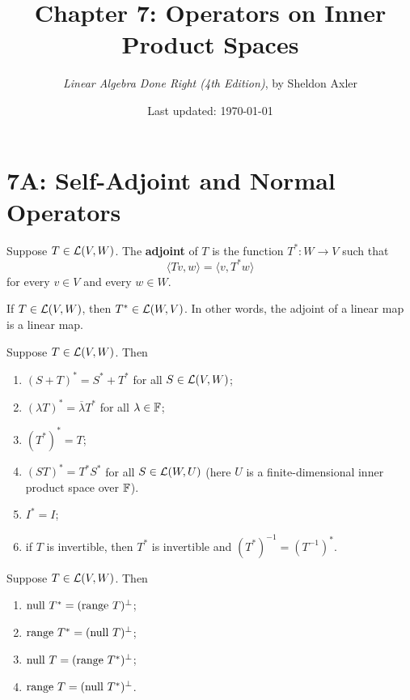 \documentclass{extarticle}
\title{\vspace{-2em}Chapter 7: Operators on Inner Product Spaces}
\author{\emph{Linear Algebra Done Right (4th Edition)}, by Sheldon Axler}
\date{Last updated: \today}
\begin{document}
\maketitle 
\tableofcontents
\newpage 


\section*{7A: Self-Adjoint and Normal Operators}

\begin{definition}[adjoint, \(T^*\)]
    Suppose \( T \in \mathcal{L}(V, W)\). The \textbf{adjoint} of \(T\) is the function \(T^* \colon W \to V\) such 
    that 
    \[\langle Tv,w \rangle = \langle v,T^* w \rangle\]
    for every \(v \in V\) and every \(w \in W\).
\end{definition}

\begin{corollary}
    If \(T \in \mathcal{L}(V, W)\), then \(T^* \in \mathcal{L}(W, V)\). In other words, the adjoint of 
    a linear map is a linear map.
\end{corollary}

\begin{corollary}
    Suppose \(T \in \mathcal{L}(V, W)\). Then 
    \begin{enumerate}[label=(\alph*)]
        \item \((S + T)^* = S^* + T^*\) for all \(S \in \mathcal{L}(V, W)\); 
        \item \((\lambda T)^* = \overline{\lambda} T^*\) for all \(\lambda \in \mathbb{F}\); 
        \item \((T^*)^* = T\); 
        \item \((ST)^* = T^* S^*\) for all \(S \in \mathcal{L}(W, U)\) (here \(U\) is a finite-dimensional 
        inner product space over \(\mathbb{F}\)). 
        \item \(I^* = I\); 
        \item if \(T\) is invertible, then \(T^*\) is invertible and \((T^*)^{-1} = (T^{-1})^*\).
    \end{enumerate}
\end{corollary}

\begin{thm}
Suppose \(T \in \mathcal{L}(V, W)\). Then 
\begin{enumerate}[label=(\alph*)]
    \item \(\text{null } T^* = (\text{range } T)^\perp\); 
    \item \(\text{range } T^* = (\text{null } T)^\perp\); 
    \item \(\text{null } T = (\text{range } T^*)^\perp\); 
    \item \(\text{range } T = (\text{null } T^*)^\perp\).
\end{enumerate}
\end{thm}
\end{document}
